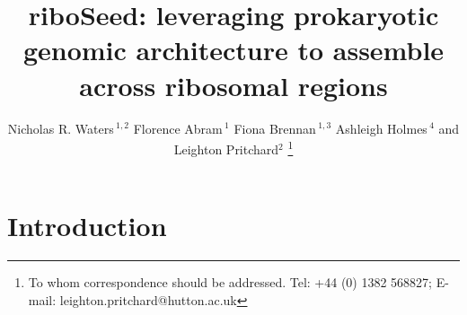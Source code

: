 \documentclass[a4,center,fleqn]{NAR}
\begin{document}
\title{riboSeed: leveraging prokaryotic genomic architecture to assemble across ribosomal regions}

\author{%
  Nicholas R. Waters\,$^{1,2}$
  Florence Abram\,$^{1}$
  Fiona Brennan\,$^{1,3}$
  Ashleigh Holmes\,$^{4}$
  and Leighton Pritchard$^{2}$
  \footnote{To whom correspondence should be addressed.
      Tel: +44 (0) 1382 568827; E-mail: leighton.pritchard@hutton.ac.uk
  }
}
\address{
  $^{1}$Department of Microbiology, School of Natural Sciences, National University of Ireland, Galway, Ireland \\
  $^{2}$Information and Computational Sciences, James Hutton Institute, Invergowrie, Dundee DD2 5DA, Scotland\\
  $^{3}$Soil and Environmental Microbiology, Environmental Research Centre, Teagasc, Johnstown Castle, Wexford, Ireland\\
  $^{4}$Cell and Molecular Sciences, James Hutton Institute, Invergowrie, Dundee DD2 5DA, Scotland\\
}


\maketitle

\begin{abstract}
  
\end{abstract}

\section{Introduction}





\enlargethispage{-65.1pt}




\end{document}
